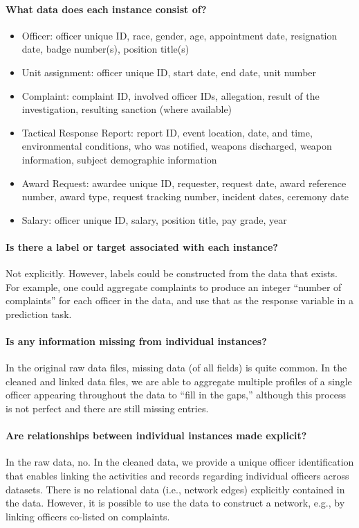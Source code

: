 \paragraph{What data does each instance consist of?}
\begin{itemize}
\item Officer: officer unique ID, race, gender, age, appointment date, resignation date, badge number(s), position title(s)
\item Unit assignment: officer unique ID, start date, end date, unit number
\item Complaint: complaint ID, involved officer IDs, allegation, result of the investigation, resulting sanction (where available)
\item Tactical Response Report: report ID, event location, date, and time, environmental conditions, who was notified, weapons discharged, weapon information, subject demographic information 
\item Award Request: awardee unique ID, requester, request date, award reference number, award type, request tracking number, incident dates, ceremony date
\item Salary: officer unique ID, salary, position title, pay grade, year
\end{itemize}

\paragraph{Is there a label or target associated with each instance?}
Not explicitly. However, labels could be constructed from the data 
that exists. For example, one could aggregate complaints to produce
an integer ``number of complaints'' for each officer in the data,
and use that as the response variable in a prediction task.

\paragraph{Is any information missing from individual instances?}
In the original raw data files, missing data (of all fields) is quite common.
In the cleaned and linked data files, we are able to aggregate multiple profiles
of a single officer appearing throughout the data to ``fill in the gaps,'' although
this process is not perfect and there are still missing entries.

\paragraph{Are relationships between individual instances made explicit?}
In the raw data, no. In the cleaned data, we provide a unique officer
identification that enables linking the activities and records regarding
individual officers across datasets. There is no relational data (i.e., network edges)
explicitly contained in the data. However, it is possible to use the data
to construct a network, e.g., by linking officers co-listed on complaints.

